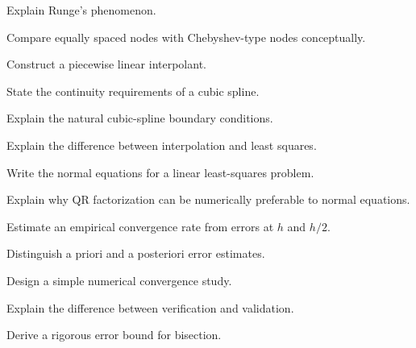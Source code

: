 \begin{exercise}[3]
Explain Runge's phenomenon.
\end{exercise}

\begin{exercise}[3]
Compare equally spaced nodes with Chebyshev-type nodes conceptually.
\end{exercise}

\begin{exercise}[3]
Construct a piecewise linear interpolant.
\end{exercise}

\begin{exercise}[3]
State the continuity requirements of a cubic spline.
\end{exercise}

\begin{exercise}[3]
Explain the natural cubic-spline boundary conditions.
\end{exercise}

\begin{exercise}[3]
Explain the difference between interpolation and least squares.
\end{exercise}

\begin{exercise}[3]
Write the normal equations for a linear least-squares problem.
\end{exercise}

\begin{exercise}[3]
Explain why QR factorization can be numerically preferable to normal
equations.
\end{exercise}

\begin{exercise}[3]
Estimate an empirical convergence rate from errors at \(h\) and \(h/2\).
\end{exercise}

\begin{exercise}[3]
Distinguish a priori and a posteriori error estimates.
\end{exercise}

\begin{exercise}[3]
Design a simple numerical convergence study.
\end{exercise}

\begin{exercise}[3]
Explain the difference between verification and validation.
\end{exercise}

\begin{exercise}[4]
Derive a rigorous error bound for bisection.
\end{exercise}


